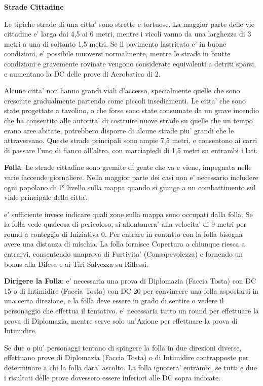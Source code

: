 \documentclass[a4paper,11pt,twoside,openany]{book}
\begin{document}
{\textbf{Strade Cittadine}

Le tipiche strade di una citta' sono strette e tortuose. La maggior parte delle vie cittadine e' larga dai 4,5 ai 6 metri, mentre i vicoli vanno da una larghezza di 3 metri a una di soltanto 1,5 metri. Se il pavimento lastricato e' in buone condizioni, e' possibile muoversi normalmente, mentre le strade in brutte condizioni e gravemente rovinate vengono considerate equivalenti a detriti sparsi, e aumentano la DC delle prove di Acrobatica di 2.

Alcune citta' non hanno grandi viali d'accesso, specialmente quelle che sono cresciute gradualmente partendo come piccoli insediamenti. Le citta' che sono state progettate a tavolino, o che forse sono state consumate da un grave incendio che ha consentito alle autorita' di costruire nuove strade su quelle che un tempo erano aree abitate, potrebbero disporre di alcune strade piu' grandi che le attraversano. Queste strade principali sono ampie 7,5 metri, e consentono ai carri di passare l'uno di fianco all'altro, con marciapiedi di 1,5 metri su entrambi i lati.

\textbf{Folla}: Le strade cittadine sono gremite di gente che va e viene, impegnata nelle varie faccende giornaliere. Nella maggior parte dei casi non e' necessario includere ogni popolano di 1° livello sulla mappa quando si giunge a un combattimento sul viale principale della citta'.

e' sufficiente invece indicare quali zone sulla mappa sono occupati dalla folla. Se la folla vede qualcosa di pericoloso, si allontanera' alla velocita' di 9 metri per round a conteggio di Iniziativa 0. Per entrare in contatto con la folla bisogna avere una distanza di mischia. La folla fornisce Copertura a chiunque riesca a entrarvi, consentendo unaprova di Furtivita' (Consapevolezza) e fornendo un bonus alla Difesa e ai Tiri Salvezza su Riflessi.

\textbf{Dirigere la Folla}: e' necessaria una prova di Diplomazia (Faccia Tosta) con DC 15 o di Intimidire (Faccia Tosta) con DC 20 per convincere una folla aspostarsi in una certa direzione, e la folla deve essere in grado di sentire o vedere il personaggio che effettua il tentativo. e' necessaria tutto un round per effettuare la prova di Diplomazia, mentre serve solo un'Azione per effettuare la prova di Intimidire.

Se due o piu' personaggi tentano di spingere la folla in due direzioni diverse, effettuano prove di Diplomazia (Faccia Tosta) o di Intimidire contrapposte per determinare a chi la folla dara' ascolto. La folla ignorera' entrambi, se tutti e due i risultati delle prove dovessero essere inferiori alle DC sopra indicate.

}
\end{document}

